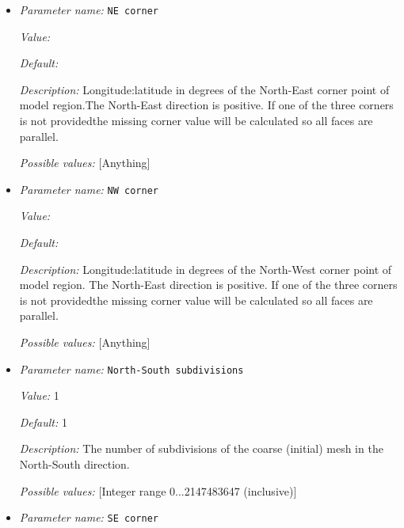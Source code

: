 \begin{itemize}
{\it Default:} 8.1819190842622e-2


{\it Description:} Eccentricity of the ellipsoid. Zero is a perfect sphere, default (8.1819190842622e-2) is WGS84.


{\it Possible values:} [Double 0...1.79769e+308 (inclusive)]
\item {\it Parameter name:} {\tt NE corner}
\label{parameters:Geometry model/Ellipsoidal chunk/NE corner}


{\it Value:} 


{\it Default:} 


{\it Description:} Longitude:latitude in degrees of the North-East corner point of model region.The North-East direction is positive. If one of the three corners is not providedthe missing corner value will be calculated so all faces are parallel.


{\it Possible values:} [Anything]
\item {\it Parameter name:} {\tt NW corner}
\label{parameters:Geometry model/Ellipsoidal chunk/NW corner}


{\it Value:} 


{\it Default:} 


{\it Description:} Longitude:latitude in degrees of the North-West corner point of model region. The North-East direction is positive. If one of the three corners is not providedthe missing corner value will be calculated so all faces are parallel.


{\it Possible values:} [Anything]
\item {\it Parameter name:} {\tt North-South subdivisions}
\label{parameters:Geometry model/Ellipsoidal chunk/North-South subdivisions}


{\it Value:} 1


{\it Default:} 1


{\it Description:} The number of subdivisions of the coarse (initial) mesh in the North-South direction.


{\it Possible values:} [Integer range 0...2147483647 (inclusive)]
\item {\it Parameter name:} {\tt SE corner}
\label{parameters:Geometry model/Ellipsoidal chunk/SE corner}



\end{itemize}
